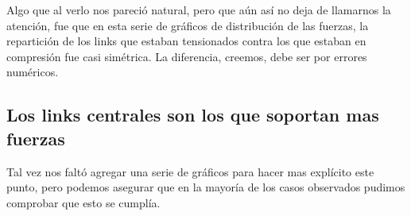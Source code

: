 Algo que al verlo nos pareció natural, pero que aún así no deja de llamarnos la atención, fue que en esta serie de gráficos de distribución de las fuerzas, la repartición de los links que estaban tensionados contra los que estaban en compresión fue casi simétrica. La diferencia, creemos, debe ser por errores numéricos.

\subsection{Los links centrales son los que soportan mas fuerzas}

Tal vez nos faltó agregar una serie de gráficos para hacer mas explícito este punto, pero podemos asegurar que en la mayoría de los casos observados pudimos comprobar que esto se cumplía.
